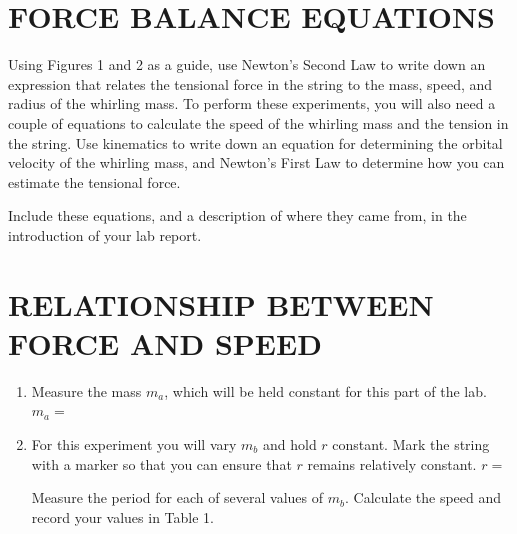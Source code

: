 \documentclass[11pt,letterpaper]{article}
\begin{document}






\section{FORCE BALANCE EQUATIONS}
Using Figures 1 and 2 as a guide, use Newton's Second Law to write down an expression that relates the tensional force in the string to the mass, speed, and radius of the whirling mass. To perform these experiments, you will also need a couple of equations to calculate the speed of the whirling mass and the tension in the string. Use kinematics to write down an equation for determining the orbital velocity of the whirling mass, and Newton's First Law to determine how you can estimate the tensional force.

Include these equations, and a description of where they came from, in the introduction of your lab report.




\section{RELATIONSHIP BETWEEN FORCE AND SPEED}
\begin{enumerate}
\item Measure the mass $m_a$, which will be held constant for this part of the lab. $m_a=$

\item For this experiment you will vary $m_b$ and hold $r$ constant. Mark the string with a marker so that you can ensure that $r$ remains relatively constant. $r=$ 

Measure the period for each of several values of $m_b$. Calculate the speed and record your values in Table 1.
\end{enumerate}
\end{document}
